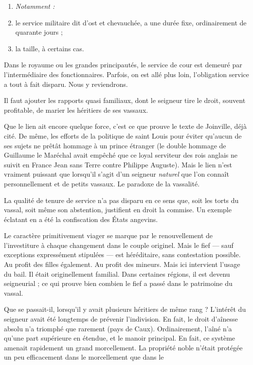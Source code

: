 \documentclass[french,twoside]{book} %
\newlength{\listmod}
\newcommand{\listhead}[1]{\hspace{-1\listmod}\emph{#1}}
\newcommand{\labelchar}[1]{{\color{rubric}\bf #1}}
\begin{document}
\begin{enumerate}[itemsep=0pt,]
\item[]\listhead{Notamment :}
\item le service militaire dit d’ost et chevauchée, a une durée fixe, ordinairement de quarante jours ;
\item la taille, à certains cas.

\end{enumerate}\noindent Dans le royaume ou les grandes principautés, le service de cour est demeuré par l’intermédiaire des fonctionnaires. Parfois, on est allé plus loin, l’obligation service a tout à fait disparu. Nous y reviendrons.\par
Il faut ajouter les rapports quasi familiaux, dont le seigneur tire le droit, souvent profitable, de marier les héritiers de ses vassaux.\par
Que le lien ait encore quelque force, c’est ce que prouve le texte de Joinville, déjà cité. De même, les efforts de la politique de saint Louis pour éviter qu’aucun de ses sujets ne prêtât hommage à un prince étranger (le double hommage de Guillaume le Maréchal avait empêché que ce loyal serviteur des rois anglais ne suivit en France Jean sans Terre contre Philippe Auguste). Mais le lien n’est vraiment puissant que lorsqu’il s’agit d’un seigneur \emph{naturel} que l’on connaît personnellement et de petits vassaux. Le paradoxe de la vassalité.\par
\bigbreak
\noindent \labelchar{e) Le droit des fiefs.}\par
La qualité de tenure de service n’a pas disparu en ce sens que, soit les torts du vassal, soit même son abstention, justifient en droit la commise. Un exemple éclatant en a été la confiscation des États angevins.\par
Le caractère primitivement viager se marque par le renouvellement de l’investiture à chaque changement dans le couple originel. Mais le fief — sauf exceptions expressément stipulées — est héréditaire, sans contestation possible. Au profit des filles également. Au profit des mineurs. Mais ici intervient l’usage du bail. Il était originellement familial. Dans certaines régions, il est devenu seigneurial ; ce qui prouve bien combien le fief a passé dans le patrimoine du vassal.\par
Que se passait-il, lorsqu’il y avait plusieurs héritiers de même rang ? L’intérêt du seigneur avait été longtemps de prévenir l’indivision. En fait, le droit d’aînesse absolu n’a triomphé que rarement (pays de Caux). Ordinairement, l’aîné n’a qu’une part supérieure en étendue, et le manoir principal. En fait, ce système amenait rapidement un grand morcellement. La propriété noble n’était protégée un peu efficacement dans le morcellement que dans le  
\end{document}

